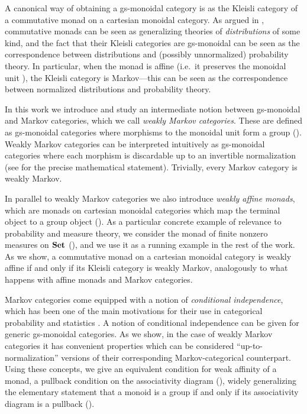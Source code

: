 \documentclass[a4paper,UKenglish,numberwithinsect,cleveref, autoref, thm-restate]{lipics-v2021}
\theoremstyle{plain} %
\theoremstyle{definition} %
\begin{document}
A canonical way of obtaining a gs-monoidal category is as the Kleisli category of a commutative monad on a cartesian monoidal category. 
As argued in \cite{kock2012distributions}, commutative monads can be seen as generalizing theories of \emph{distributions} of some kind, and the fact that their Kleisli categories are gs-monoidal can be seen as the correspondence between distributions and (possibly unnormalized) probability theory.
In particular, when the monad is affine (i.e.~it preserves the monoidal unit \cite{Kock71,Jacobs1994}), the Kleisli category is Markov---this can be seen as the correspondence between normalized distributions and probability theory.

In this work we introduce and study an intermediate notion between gs-monoidal and Markov categories, which we call \emph{weakly Markov categories}. 
These are defined as gs-monoidal categories where morphisms to the monoidal unit form a group (). 
Weakly Markov categories can be interpreted intuitively as gs-monoidal categories where each morphism is discardable up to an invertible normalization (see  for the precise mathematical statement). Trivially, every Markov category is weakly Markov.

In parallel to weakly Markov categories we also introduce \emph{weakly affine monads}, which are monads on cartesian monoidal categories which map the terminal object to a group object ().
As a particular concrete example of relevance to probability and measure theory, we consider the monad of finite nonzero measures on $\mathbf{Set}$ (), and we use it as a running example in the rest of the work.
As we show, a commutative monad on a cartesian monoidal category is weakly affine if and only if its Kleisli category is weakly Markov, analogously to what happens with affine monads and Markov categories. 

Markov categories come equipped with a notion of \emph{conditional independence}, which has been one of the main motivations for their use in categorical probability and statistics \cite{cho_jacobs_2019,Fritz_2020,fritz2022dseparation}.
A notion of conditional independence can be given for generic gs-monoidal categories. As we show, in the case of weakly Markov categories it has convenient properties which can be considered ``up-to-normalization'' versions of their corresponding Markov-categorical counterpart.
Using these concepts, we give an equivalent condition for weak affinity of a monad, a pullback condition on the associativity diagram (), widely generalizing the elementary statement that a monoid is a group if and only if its associativity diagram is a pullback (). 
\end{document}
